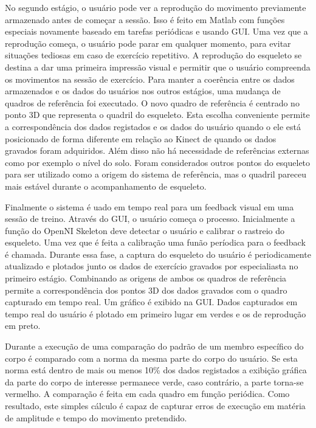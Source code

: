 No segundo estágio, o usuário pode ver a reprodução do movimento previamente armazenado
antes de começar a sessão. Isso é feito em Matlab com funções especiais novamente 
baseado em tarefas periódicas e usando GUI. Uma vez que a reprodução começa, o usuário
pode parar em qualquer momento, para evitar situações tediosas em caso de exercício
repetitivo. A reprodução do esqueleto se destina a dar uma primeira impressão visual
e permitir que o usuário compreenda os movimentos na sessão de exercício. Para manter
a coerência entre os dados armazenados e os dados do usuários nos outros estágios,
uma mudança de quadros de referência foi executado. O novo quadro de referência
é centrado no ponto 3D que representa o quadril do esqueleto. 
Esta escolha conveniente permite a correspondência dos dados registados e os dados
 do usuário quando o ele está posicionado de forma diferente em relação ao Kinect
 de quando os dados gravados foram adquiridos. Além disso não há necessidade 
de referências externas como por exemplo o nível do solo. Foram considerados outros
 pontos do esqueleto para ser utilizado como a origem do sistema de referência, 
mas o quadril pareceu mais estável durante o acompanhamento de esqueleto.

Finalmente o sistema é uado em tempo real para um feedback visual em uma sessão 
de treino. Através do GUI, o usuário começa o processo. Inicialmente a função do 
 OpenNI Skeleton deve detectar o usuário e calibrar o rastreio do esqueleto. Uma
vez que é feita a calibração uma funão períodica para o feedback é chamada. Durante
essa fase, a captura do esqueleto do usuário é periodicamente atualizado e plotados 
junto os dados de exercício gravados por especialiasta no primeiro estágio. Combinando
 as origens de ambos os quadros de referência permite a correspondência dos pontos 3D
 dos dados gravados com o quadro capturado em tempo real. Um gráfico é exibido na GUI.
 Dados capturados em tempo real do usuário é plotado em primeiro lugar em verdes 
e os de reprodução em preto.

Durante a execução de uma comparação do padrão de um membro específico do corpo
 é comparado com a norma da mesma parte do corpo do usuário. Se esta norma está
 dentro de mais ou menos 10\% dos dados registados a exibição gráfica da parte 
do corpo de interesse permanece verde, caso contrário, a parte torna-se vermelho.
A comparação é feita em cada quadro em função periódica. Como resultado, este simples
cálculo é capaz de capturar erros de execução em matéria de amplitude e tempo do
movimento pretendido.\cite{roberto}

